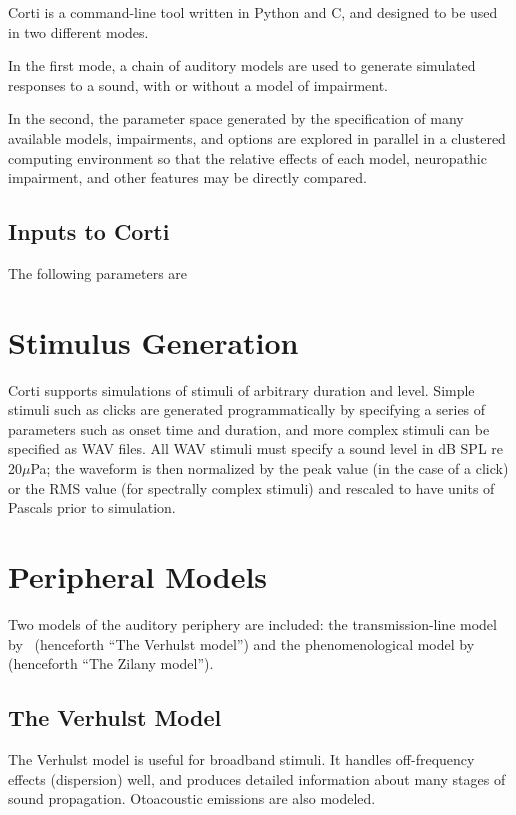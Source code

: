 Corti is a command-line tool written in Python and C, and designed to be used in two different modes.  

In the first mode, a chain of auditory models are used to generate simulated responses to a sound, with or without a model of impairment.  

In the second, the parameter space generated by the specification of many available models, impairments, and options are explored in parallel in a clustered computing environment so that the relative effects of each model, neuropathic impairment, and other features may be directly compared.
\subsection{Inputs to Corti} %
\label{sub:inputs_to_corti}
The following parameters are
\section{Stimulus Generation} %
\label{sec:stimulus_generation}
Corti supports simulations of stimuli of arbitrary duration and level.  Simple stimuli such as clicks are generated programmatically by specifying a series of parameters such as onset time and duration, and more complex stimuli can be specified as WAV files.  All WAV stimuli must specify a sound level in dB SPL re 20$\mu$Pa; the waveform is then normalized by the peak value (in the case of a click) or the RMS value (for spectrally complex stimuli) and rescaled to have units of Pascals prior to simulation.
\section{Peripheral Models} %
\label{sec:peripheral_models}
Two models of the auditory periphery are included: the transmission-line model by~\cite{Verhulst2015Functional} (henceforth ``The Verhulst model'') and the phenomenological model by~\cite{Zilany2014Updated} (henceforth ``The Zilany model'').

\subsection{The Verhulst Model} %
\label{sub:the_verhulst_model1}
The Verhulst model is useful for broadband stimuli.  It handles off-frequency effects (dispersion) well, and produces detailed information about many stages of sound propagation.  Otoacoustic emissions are also modeled. 

